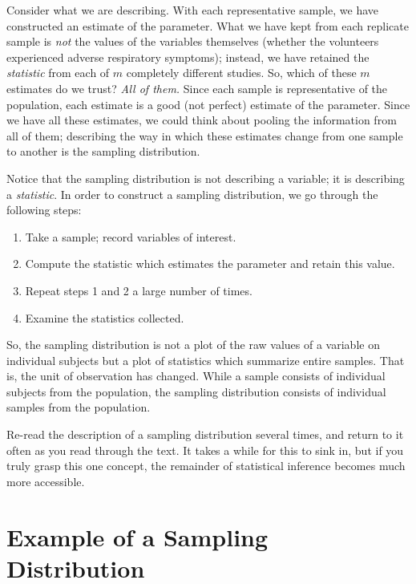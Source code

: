\documentclass[]{book}
\providecommand{\tightlist}{%
  \setlength{\itemsep}{0pt}\setlength{\parskip}{0pt}}
\theoremstyle{plain}
\theoremstyle{mydefn}
\theoremstyle{myexmpl}
\theoremstyle{remark}
\let\BeginKnitrBlock\begin \let\EndKnitrBlock\end
\let\BeginKnitrBlock\begin \let\EndKnitrBlock\end
\begin{document}
Consider what we are describing. With each representative sample, we
have constructed an estimate of the parameter. What we have kept from
each replicate sample is \emph{not} the values of the variables
themselves (whether the volunteers experienced adverse respiratory
symptoms); instead, we have retained the \emph{statistic} from each of
\(m\) completely different studies. So, which of these \(m\) estimates
do we trust? \emph{All of them.} Since each sample is representative of
the population, each estimate is a good (not perfect) estimate of the
parameter. Since we have all these estimates, we could think about
pooling the information from all of them; describing the way in which
these estimates change from one sample to another is the sampling
distribution.

Notice that the sampling distribution is not describing a variable; it
is describing a \emph{statistic}. In order to construct a sampling
distribution, we go through the following steps:

\begin{enumerate}
\def\labelenumi{\arabic{enumi}.}
\tightlist
\item
  Take a sample; record variables of interest.
\item
  Compute the statistic which estimates the parameter and retain this
  value.
\item
  Repeat steps 1 and 2 a large number of times.
\item
  Examine the statistics collected.
\end{enumerate}

So, the sampling distribution is not a plot of the raw values of a
variable on individual subjects but a plot of statistics which summarize
entire samples. That is, the unit of observation has changed. While a
sample consists of individual subjects from the population, the sampling
distribution consists of individual samples from the population.

\BeginKnitrBlock{rmdtip}
Re-read the description of a sampling distribution several times, and
return to it often as you read through the text. It takes a while for
this to sink in, but if you truly grasp this one concept, the remainder
of statistical inference becomes much more accessible.
\EndKnitrBlock{rmdtip}

\section{Example of a Sampling
Distribution}\label{example-of-a-sampling-distribution}
\end{document}
